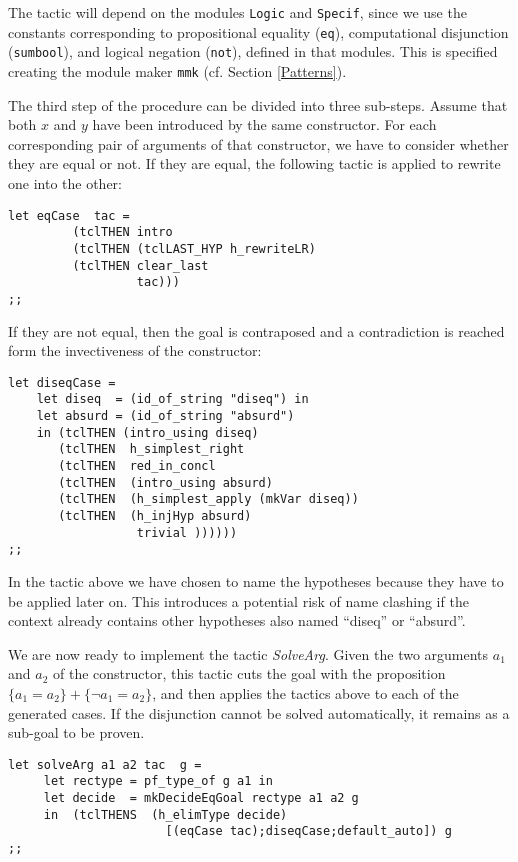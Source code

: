 The tactic will depend on the \Coq modules \texttt{Logic} and
\texttt{Specif}, since we use the constants corresponding to
propositional equality (\texttt{eq}), computational disjunction
(\texttt{sumbool}), and logical negation (\texttt{not}), defined in
that modules. This is specified creating the module maker
\texttt{mmk} (cf. Section \ref{Patterns}).

The third step of the procedure can be divided into three sub-steps.
Assume that both $x$ and $y$ have been introduced by the same
constructor.  For each corresponding pair of arguments of that
constructor, we have to consider whether they are equal or not.  If
they are equal, the following tactic is applied to rewrite one into
the other:

\begin{verbatim}
let eqCase  tac = 
         (tclTHEN intro  
         (tclTHEN (tclLAST_HYP h_rewriteLR)
         (tclTHEN clear_last 
                  tac)))
;;
\end{verbatim}


If they are not equal, then the goal is contraposed and a
contradiction is reached form the invectiveness of the constructor:

\begin{verbatim}
let diseqCase = 
    let diseq  = (id_of_string "diseq") in
    let absurd = (id_of_string "absurd")
    in (tclTHEN (intro_using diseq)
       (tclTHEN  h_simplest_right
       (tclTHEN  red_in_concl
       (tclTHEN  (intro_using absurd)
       (tclTHEN  (h_simplest_apply (mkVar diseq))
       (tclTHEN  (h_injHyp absurd)
                  trivial ))))))
;;
\end{verbatim}

In the tactic above we have chosen to name the hypotheses because
they have to be applied later on. This introduces a potential risk
of name clashing if the context already contains other hypotheses 
also named ``diseq'' or ``absurd''.

We are now ready to implement the tactic \textsl{SolveArg}.  Given the
two arguments $a_1$ and $a_2$ of the constructor, this tactic cuts the
goal with the proposition $\{a_1=a_2\}+\{\neg a_1=a_2\}$, and then
applies the tactics above to each of the generated cases. If the
disjunction cannot be solved automatically, it remains as a sub-goal
to be proven.

\begin{verbatim}
let solveArg a1 a2 tac  g = 
     let rectype = pf_type_of g a1 in
     let decide  = mkDecideEqGoal rectype a1 a2 g
     in  (tclTHENS  (h_elimType decide) 
                      [(eqCase tac);diseqCase;default_auto]) g
;;
\end{verbatim}


